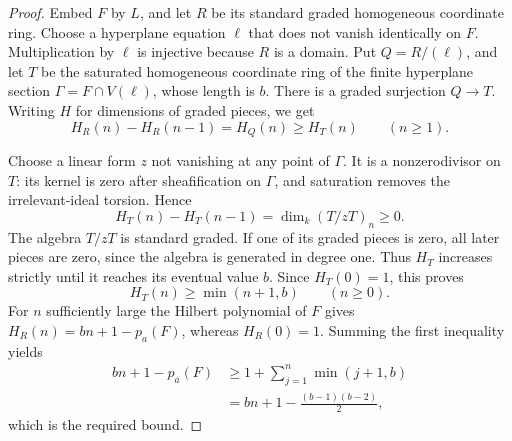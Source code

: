 \begin{proof}
Embed $F$ by $L$, and let $R$ be its standard graded homogeneous
coordinate ring. Choose a hyperplane equation $\ell$ that does not
vanish identically on $F$. Multiplication by $\ell$ is injective because
$R$ is a domain. Put $Q=R/(\ell)$, and let $T$ be the saturated
homogeneous coordinate ring of the finite hyperplane section
$\Gamma=F\cap V(\ell)$, whose length is $b$. There is a graded
surjection $Q\to T$. Writing $H$ for dimensions of graded pieces, we get
\[
 H_R(n)-H_R(n-1)=H_Q(n)\geq H_T(n)\qquad(n\geq1).
\]

Choose a linear form $z$ not vanishing at any point of $\Gamma$.
It is a nonzerodivisor on $T$: its kernel is zero after sheafification
on $\Gamma$, and saturation removes the irrelevant-ideal torsion.
Hence
\[
 H_T(n)-H_T(n-1)=\dim_k(T/zT)_n\geq0.
\]
The algebra $T/zT$ is standard graded. If one of its graded pieces is
zero, all later pieces are zero, since the algebra is generated in
degree one. Thus $H_T$ increases strictly until it reaches its eventual
value $b$. Since $H_T(0)=1$, this proves
\[
 H_T(n)\geq\min(n+1,b)\qquad(n\geq0).
\]
For $n$ sufficiently large the Hilbert polynomial of $F$ gives
$H_R(n)=bn+1-p_a(F)$, whereas $H_R(0)=1$. Summing the first inequality
yields
\[
 \begin{split}
 bn+1-p_a(F)
 &\geq1+\sum_{j=1}^{n}\min(j+1,b)\\
 &=bn+1-\frac{(b-1)(b-2)}2,
 \end{split}
\]
which is the required bound.
\end{proof}

